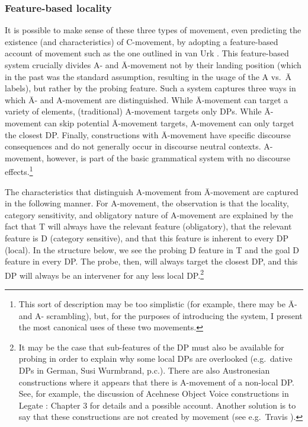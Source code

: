 \documentclass[output=paper,colorlinks,citecolor=brown,
]{langscibook}
\begin{document}
\subsubsection{Feature-based locality\label{sec:feature}}

It is possible to make sense of these three types of movement, even predicting the existence (and characteristics) of C-movement, by adopting a feature-based account of movement such as the one outlined in van Urk \citeyearpar{vanUrk:2015a}. This feature-based system crucially divides A- and \=A-movement not by their landing position (which in the past was the standard assumption, resulting in the usage of the A vs.\ \=A labels), but rather by the probing feature. Such a  system  captures three ways in which \=A- and A-movement are distinguished.  While \=A-movement can target a variety of elements, (traditional) A-movement targets only DPs.  While \=A-movement can skip potential \=A-movement targets, A-movement can only target the closest DP.  Finally, constructions with \=A-movement have specific discourse consequences and do not generally occur in discourse neutral contexts.  A-movement, however, is part of the basic grammatical system with no discourse effects.\footnote{This sort of description may be too simplistic (for example, there may be \=A- and A- scrambling), but, for the purposes of introducing the system, I present the most canonical uses of these two movements.}  

The characteristics that distinguish  A-movement from \=A-movement are captured in the following manner.  For A-movement, the observation is that the locality, category sensitivity, and obligatory nature of A-movement are explained by the fact that T will always have the relevant feature (obligatory), that the relevant feature is D (category sensitive), and that this feature is inherent to every DP (local).  In the structure below, we see the probing D feature in T and the goal D feature in every DP.  The probe, then, will always target the closest DP, and this DP will always be an intervener for any less local DP.\footnote{It may be the case that sub-features of the DP must also be available for probing in order to explain why some local DPs are overlooked (e.g.\ dative DPs in German, Susi Wurmbrand, p.c.).  There are also  Austronesian constructions where it appears that there is A-movement of a non-local DP.  See, for example, the discussion of Acehnese Object Voice constructions in Legate \citeyearpar{Legate:2014}: Chapter 3 for details and a possible account.  Another solution is to say that these constructions are not created by movement (see e.g.\ Travis \citeyear{Travis:2006a}).}
\end{document}
